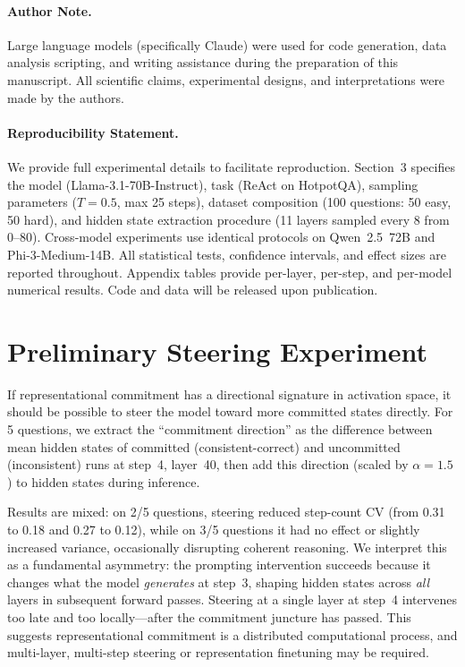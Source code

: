 \documentclass{article}
\begin{document}

\paragraph{Author Note.} Large language models (specifically Claude) were used for code generation, data analysis scripting, and writing assistance during the preparation of this manuscript. All scientific claims, experimental designs, and interpretations were made by the authors.

\paragraph{Reproducibility Statement.} We provide full experimental details to facilitate reproduction. Section~3 specifies the model (Llama-3.1-70B-Instruct), task (ReAct on HotpotQA), sampling parameters ($T{=}0.5$, max 25 steps), dataset composition (100 questions: 50 easy, 50 hard), and hidden state extraction procedure (11 layers sampled every 8 from 0--80). Cross-model experiments use identical protocols on Qwen~2.5~72B and Phi-3-Medium-14B. All statistical tests, confidence intervals, and effect sizes are reported throughout. Appendix tables provide per-layer, per-step, and per-model numerical results. Code and data will be released upon publication.




\appendix

\section{Preliminary Steering Experiment}
\label{app:steering}

If representational commitment has a directional signature in activation space, it should be possible to steer the model toward more committed states directly. For 5 questions, we extract the ``commitment direction'' as the difference between mean hidden states of committed (consistent-correct) and uncommitted (inconsistent) runs at step~4, layer~40, then add this direction (scaled by $\alpha = 1.5$) to hidden states during inference.

Results are mixed: on 2/5 questions, steering reduced step-count CV (from 0.31 to 0.18 and 0.27 to 0.12), while on 3/5 questions it had no effect or slightly increased variance, occasionally disrupting coherent reasoning. We interpret this as a fundamental asymmetry: the prompting intervention succeeds because it changes what the model \emph{generates} at step~3, shaping hidden states across \emph{all} layers in subsequent forward passes. Steering at a single layer at step~4 intervenes too late and too locally---after the commitment juncture has passed. This suggests representational commitment is a distributed computational process, and multi-layer, multi-step steering \citep{zou2023repe} or representation finetuning may be required.
\end{document}
